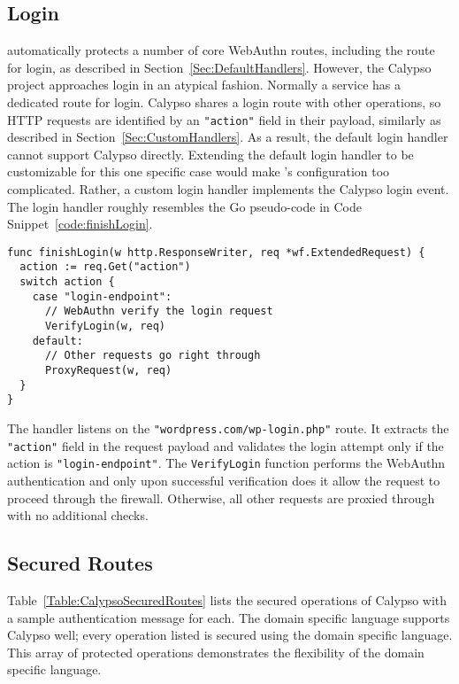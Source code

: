 \subsection{Login}\label{Sec:CalypsoLogin}

\sys{} automatically protects a number of core WebAuthn routes, including the route for login, as described in Section~\ref{Sec:DefaultHandlers}. However, the Calypso project approaches login in an atypical fashion. Normally a service has a dedicated route for login. Calypso shares a login route with other operations, so HTTP requests are identified by an \lstinline{"action"} field in their payload, similarly as described in Section~\ref{Sec:CustomHandlers}. As a result, the default login handler cannot support Calypso directly. Extending the default login handler to be customizable for this one specific case would make \sys{}'s configuration too complicated. Rather, a custom login handler implements the Calypso login event. The login handler roughly resembles the Go pseudo-code in Code Snippet~\ref{code:finishLogin}.

\begin{lstlisting}[float=h,label=code:finishLogin,caption=Go pseudo-code for the custom login handler for Calypso.]
func finishLogin(w http.ResponseWriter, req *wf.ExtendedRequest) {
  action := req.Get("action")
  switch action {
    case "login-endpoint":
      // WebAuthn verify the login request
      VerifyLogin(w, req)
    default:
      // Other requests go right through
      ProxyRequest(w, req)
  }
}
\end{lstlisting}

The handler listens on the \lstinline{"wordpress.com/wp-login.php"} route. It extracts the \lstinline{"action"} field in the request payload and validates the login attempt only if the action is \lstinline{"login-endpoint"}. The \lstinline{VerifyLogin} function performs the WebAuthn authentication and only upon successful verification does it allow the request to proceed through the firewall. Otherwise, all other requests are proxied through with no additional checks.

\subsection{Secured Routes}\label{Sec:CalypsoSecuredRoutes}

Table~\ref{Table:CalypsoSecuredRoutes} lists the secured operations of Calypso with a sample authentication message for each. The domain specific language supports Calypso well; every operation listed is secured using the domain specific language. This array of protected operations demonstrates the flexibility of the domain specific language.

